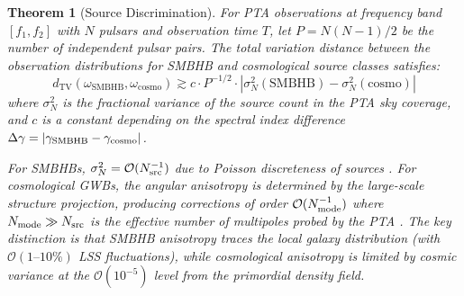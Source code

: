 \documentclass[11pt,a4paper]{article}
\newtheorem{theorem}{Theorem}[section]
\begin{document}
\begin{theorem}[Source Discrimination]\label{thm:discrimination}
For PTA observations at frequency band $[f_1, f_2]$ with $N$ pulsars and observation time $T$, let $P = N(N-1)/2$ be the number of independent pulsar pairs. The total variation distance between the observation distributions for SMBHB and cosmological source classes satisfies:
\begin{equation}
d_{\mathrm{TV}}(\omega_{\mathrm{SMBHB}}, \omega_{\mathrm{cosmo}}) \gtrsim c \cdot P^{-1/2} \cdot \left| \sigma_N^2(\mathrm{SMBHB}) - \sigma_N^2(\mathrm{cosmo}) \right|
\end{equation}
where $\sigma_N^2$ is the fractional variance of the source count in the PTA sky coverage, and $c$ is a constant depending on the spectral index difference $\Delta\gamma = |\gamma_{\rm SMBHB} - \gamma_{\rm cosmo}|$.

For SMBHBs, $\sigma_N^2 = \mathcal{O}(N_{\rm src}^{-1})$ due to Poisson discreteness of sources \cite{Rogers:2016}. For cosmological GWBs, the angular anisotropy is determined by the large-scale structure projection, producing corrections of order $\mathcal{O}(N_{\rm mode}^{-1})$ where $N_{\rm mode} \gg N_{\rm src}$ is the effective number of multipoles probed by the PTA \cite{Gong:2021}. The key distinction is that SMBHB anisotropy traces the local galaxy distribution (with $\mathcal{O}(1\text{--}10\%)$ LSS fluctuations), while cosmological anisotropy is limited by cosmic variance at the $\mathcal{O}(10^{-5})$ level from the primordial density field.
\end{theorem}
\end{document}
